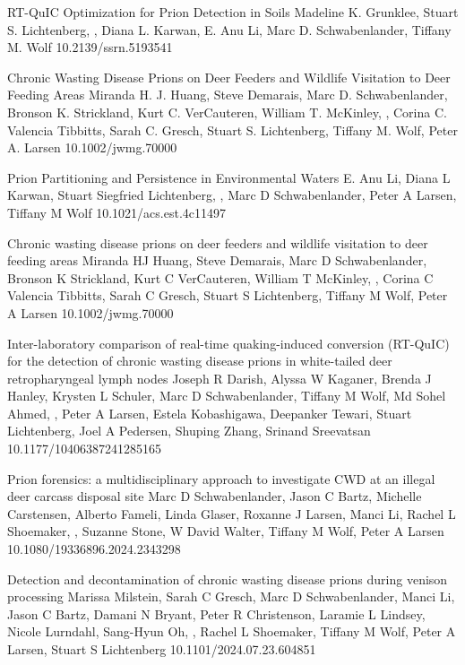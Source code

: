 \documentclass{resume}
\begin{document}
        \begin{samepage}
            {RT-QuIC Optimization for Prion Detection in Soils}
            {Madeline K. Grunklee, Stuart S. Lichtenberg, \me{}, Diana L. Karwan, E. Anu Li, Marc D. Schwabenlander, Tiffany M. Wolf}
            {10.2139/ssrn.5193541}

            {Chronic Wasting Disease Prions on Deer Feeders and Wildlife Visitation to Deer Feeding Areas}
            {Miranda H. J. Huang,  Steve Demarais,  Marc D. Schwabenlander,  Bronson K. Strickland,  Kurt C. VerCauteren,  William T. McKinley,  \me{},  Corina C. Valencia Tibbitts,  Sarah C. Gresch,  Stuart S. Lichtenberg,  Tiffany M. Wolf,  Peter A. Larsen}
            {10.1002/jwmg.70000}

            {Prion Partitioning and Persistence in Environmental Waters}
            {E. Anu Li, Diana L Karwan, Stuart Siegfried Lichtenberg, \me{}, Marc D Schwabenlander, Peter A Larsen, Tiffany M Wolf}
            {10.1021/acs.est.4c11497}

            {Chronic wasting disease prions on deer feeders and wildlife visitation to deer feeding areas}
            {Miranda HJ Huang, Steve Demarais, Marc D Schwabenlander, Bronson K Strickland, Kurt C VerCauteren, William T McKinley, \me{}, Corina C Valencia Tibbitts, Sarah C Gresch, Stuart S Lichtenberg, Tiffany M Wolf, Peter A Larsen}
            {10.1002/jwmg.70000}

            {Inter-laboratory comparison of real-time quaking-induced conversion (RT-QuIC) for the detection of chronic wasting disease prions in white-tailed deer retropharyngeal lymph nodes}
            {Joseph R Darish, Alyssa W Kaganer, Brenda J Hanley, Krysten L Schuler, Marc D Schwabenlander, Tiffany M Wolf, Md Sohel Ahmed, \me{}, Peter A Larsen, Estela Kobashigawa, Deepanker Tewari, Stuart Lichtenberg, Joel A Pedersen, Shuping Zhang, Srinand Sreevatsan}
            {10.1177/10406387241285165}

            {Prion forensics: a multidisciplinary approach to investigate CWD at an illegal deer carcass disposal site}
            {Marc D Schwabenlander, Jason C Bartz, Michelle Carstensen, Alberto Fameli, Linda Glaser, Roxanne J Larsen, Manci Li, Rachel L Shoemaker, \me{}, Suzanne Stone, W David Walter, Tiffany M Wolf, Peter A Larsen}
            {10.1080/19336896.2024.2343298}

            {Detection and decontamination of chronic wasting disease prions during venison processing}
            {Marissa Milstein, Sarah C Gresch, Marc D Schwabenlander, Manci Li, Jason C Bartz, Damani N Bryant, Peter R Christenson, Laramie L Lindsey, Nicole Lurndahl, Sang-Hyun Oh, \me{}, Rachel L Shoemaker, Tiffany M Wolf, Peter A Larsen, Stuart S Lichtenberg}
            {10.1101/2024.07.23.604851}


\end{samepage}
\end{document}

